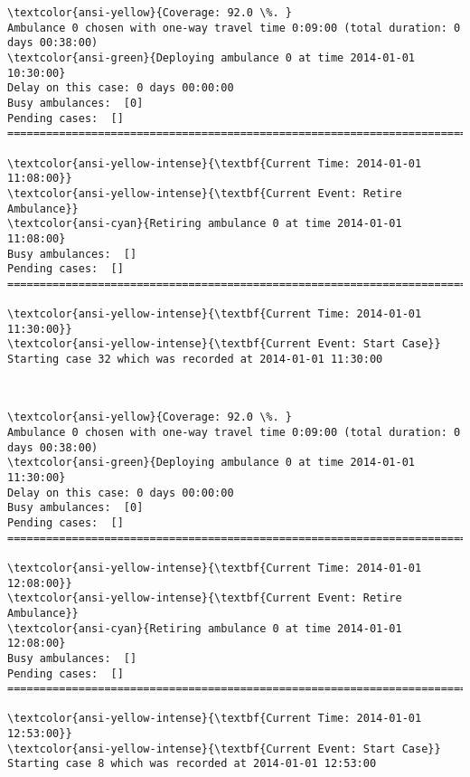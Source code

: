\documentclass[11pt]{article}
\begin{document}
    \begin{Verbatim}[commandchars=\\\{\}]
\textcolor{ansi-yellow}{Coverage: 92.0 \%. }
Ambulance 0 chosen with one-way travel time 0:09:00 (total duration: 0 days 00:38:00)
\textcolor{ansi-green}{Deploying ambulance 0 at time 2014-01-01 10:30:00}
Delay on this case: 0 days 00:00:00
Busy ambulances:  [0]
Pending cases:  []
========================================================================

\textcolor{ansi-yellow-intense}{\textbf{Current Time: 2014-01-01 11:08:00}}
\textcolor{ansi-yellow-intense}{\textbf{Current Event: Retire Ambulance}}
\textcolor{ansi-cyan}{Retiring ambulance 0 at time 2014-01-01 11:08:00}
Busy ambulances:  []
Pending cases:  []
========================================================================

\textcolor{ansi-yellow-intense}{\textbf{Current Time: 2014-01-01 11:30:00}}
\textcolor{ansi-yellow-intense}{\textbf{Current Event: Start Case}}
Starting case 32 which was recorded at 2014-01-01 11:30:00

    \end{Verbatim}

    \begin{center}
    \end{center}
    { \hspace*{\fill} \\}
    
    \begin{Verbatim}[commandchars=\\\{\}]
\textcolor{ansi-yellow}{Coverage: 92.0 \%. }
Ambulance 0 chosen with one-way travel time 0:09:00 (total duration: 0 days 00:38:00)
\textcolor{ansi-green}{Deploying ambulance 0 at time 2014-01-01 11:30:00}
Delay on this case: 0 days 00:00:00
Busy ambulances:  [0]
Pending cases:  []
========================================================================

\textcolor{ansi-yellow-intense}{\textbf{Current Time: 2014-01-01 12:08:00}}
\textcolor{ansi-yellow-intense}{\textbf{Current Event: Retire Ambulance}}
\textcolor{ansi-cyan}{Retiring ambulance 0 at time 2014-01-01 12:08:00}
Busy ambulances:  []
Pending cases:  []
========================================================================

\textcolor{ansi-yellow-intense}{\textbf{Current Time: 2014-01-01 12:53:00}}
\textcolor{ansi-yellow-intense}{\textbf{Current Event: Start Case}}
Starting case 8 which was recorded at 2014-01-01 12:53:00

    \end{Verbatim}
\end{document}
